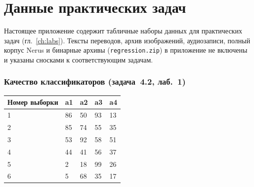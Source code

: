 \chapter{Данные практических задач}
\label{app:lab-data}

Настоящее приложение содержит табличные наборы данных для практических задач (гл.~\ref{ch:labs}).
Тексты переводов, архив изображений, аудиозаписи, полный корпус Nerus и бинарные архивы (\texttt{regression.zip}) в приложение не включены и указаны сносками к соответствующим задачам.

\subsection{Качество классификаторов (задача~4.2, лаб.~1)}
\label{app:data-classifiers}
\begin{center}
\footnotesize
\begin{tabular}{@{}lllll@{}}
 \toprule
\textbf{Номер выборки} & \textbf{a1} & \textbf{a2} & \textbf{a3} & \textbf{a4} \\
 \midrule
1 & 86 & 50 & 93 & 13 \\
2 & 85 & 74 & 55 & 35 \\
3 & 53 & 92 & 58 & 51 \\
4 & 44 & 41 & 56 & 37 \\
5 & 2 & 18 & 99 & 26 \\
6 & 5 & 68 & 35 & 17 \\
 \bottomrule
\end{tabular}
\end{center}

